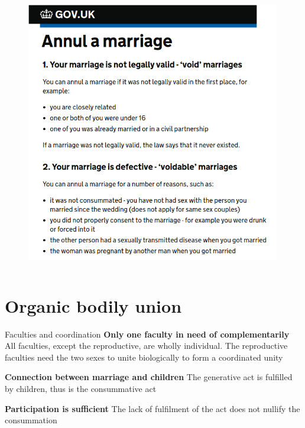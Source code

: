 \documentclass[xcolor=dvipsnames]{beamer}
\begin{document}
\begin{frame}[plain]
  \begin{columns}[T] %
    \begin{column}{0.7\textwidth}
      \begin{figure}[H]
        \centering
        \includegraphics[width=0.99\textwidth]{annul-uk}
      \end{figure}
    \end{column}%
  \end{columns}
\end{frame}


\section{Organic bodily union}


\begin{frame}{Faculties and coordination}
\textbf{Only one faculty in need of complementarily}\newline
All faculties, except the reproductive, are wholly individual. The reproductive faculties need the two sexes to unite biologically to form a coordinated unity \vspace{10mm}

\textbf{Connection between marriage and children}\newline
The generative act is fulfilled by children, thus is the consummative act \vspace{10mm}

\textbf{Participation is sufficient}\newline
The lack of fulfilment of the act does not nullify the consummation \vspace{10mm}
\end{frame}
\end{document}
